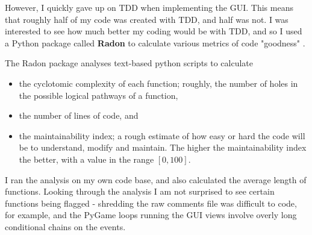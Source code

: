 \documentclass[10pt]{article}
\begin{document}
However, I quickly gave up on TDD when implementing the GUI. This means that roughly half of my code was created with TDD, and half was not. I was interested to see how much better my coding would be with TDD, and so I used a Python package called \textbf{Radon} to calculate various metrics of code "goodness" \cite{Oman92}.

The Radon package analyses text-based python scripts to calculate
\begin{itemize}
\item the cyclotomic complexity of each function; roughly, the number of holes in the possible logical pathways of a function,
\item the number of lines of code, and
\item the maintainability index; a rough estimate of how easy or hard the code will be to understand, modify and maintain\cite{Oman92}. The higher the maintainability index the better, with a value in the range $[0, 100]$.
\end{itemize}
I ran the analysis on my own code base, and also calculated the average length of functions. Looking through the analysis I am not surprised to see certain functions being flagged - shredding the raw comments file was difficult to code, for example, and the PyGame loops running the GUI views involve overly long conditional chains on the events.
\end{document}
